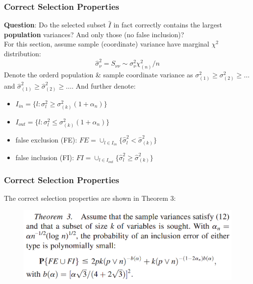 \documentclass{beamer}
\begin{document}
	\begin{frame}
		\frametitle{Correct Selection Properties}
		\textbf{Question}: Do the selected subset $\hat{I}$ in fact correctly contains the largest \textbf{population} variances? And only those (no false inclusion)?\\
		For this section, assume sample (coordinate) variance have marginal $\chi^2$ distribution:
		$$\hat{\sigma}^2_{\nu} = S_{\nu\nu}\sim \sigma^2_{\nu}\chi^2_{(n)}/n$$
		Denote the orderd population \& sample coordinate variance as $\sigma^2_{(1)}\geq \sigma^2_{(2)}\geq\ldots$ and $\hat{\sigma}^2_{(1)}\geq \hat{\sigma}^2_{(2)}\geq\ldots$. And further denote:
		\begin{itemize}
			\item
			$I_{in} = \{l:\sigma^2_l \geq \sigma^2_{(k)}(1+\alpha_n)\}$
			\item
			$I_{out} = \{l:\sigma^2_l \leq \sigma^2_{(k)}(1+\alpha_n)\}$
			\item
			false exclusion (FE): $FE = \cup_{l\in I_{in}} \{\hat{\sigma}^2_l < \hat{\sigma}^2_{(k)}\}$
			\item 
			false inclusion (FI): $FI = \cup_{l\in I_{out}} \{\hat{\sigma}^2_l \geq \hat{\sigma}^2_{(k)}\}$
		\end{itemize}
	\end{frame}
	
	\begin{frame}
		\frametitle{Correct Selection Properties}
		The correct selection properties are shown in Theorem 3:
		\begin{figure}
			\includegraphics[width=0.8\linewidth]{image007.png}
		\end{figure}
		
	\end{frame}
	
\end{document}

